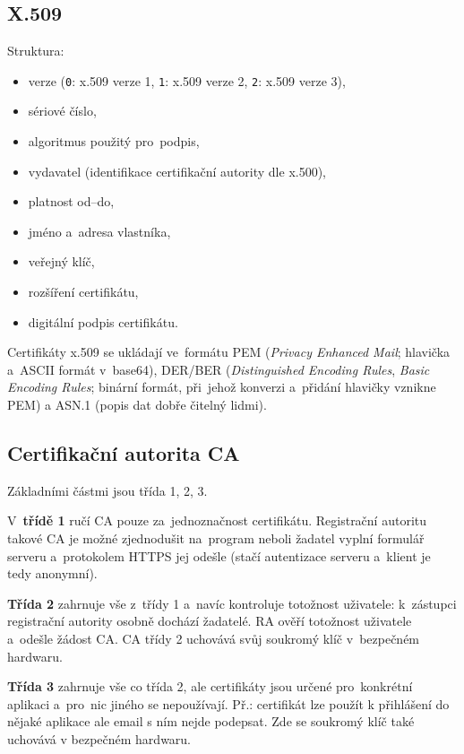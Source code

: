 \subsection{X.509}
Struktura:
\begin{itemize}[noitemsep]
    \item verze (\texttt{0}: x.509 verze 1, \texttt{1}: x.509 verze 2, \texttt{2}: x.509 verze 3),
    \item sériové číslo,
    \item algoritmus použitý pro~podpis,
    \item vydavatel (identifikace certifikační autority dle x.500),
    \item platnost od--do,
    \item jméno a~adresa vlastníka,
    \item veřejný klíč,
    \item rozšíření certifikátu,
    \item digitální podpis certifikátu.
\end{itemize}

Certifikáty x.509 se ukládají ve~formátu PEM (\emph{Privacy Enhanced Mail}; hlavička a~ASCII formát v~base64), DER/BER (\emph{Distinguished Encoding Rules}, \emph{Basic Encoding Rules}; binární formát, při~jehož konverzi a~přidání hlavičky vznikne PEM) a ASN.1 (popis dat dobře čitelný lidmi).

\subsection{Certifikační autorita CA}

Základními částmi jsou třída 1, 2, 3.

V~\textbf{třídě 1} ručí CA pouze za~jednoznačnost certifikátu. Registrační autoritu takové CA je možné zjednodušit na~program neboli žadatel vyplní formulář serveru a~protokolem HTTPS jej odešle (stačí autentizace serveru a~klient je tedy anonymní).

\textbf{Třída 2} zahrnuje vše z~třídy 1 a~navíc kontroluje totožnost uživatele: k~zástupci registrační autority osobně dochází žadatelé. RA ověří totožnost uživatele a~odešle žádost CA. CA třídy 2 uchovává svůj soukromý klíč v~bezpečném hardwaru.

\textbf{Třída 3} zahrnuje vše co třída 2, ale certifikáty jsou určené pro~konkrétní aplikaci a~pro~nic jiného se nepoužívají. Př.: certifikát lze použít k přihlášení do nějaké aplikace ale email s ním nejde podepsat. Zde se soukromý klíč také uchovává v bezpečném hardwaru.

